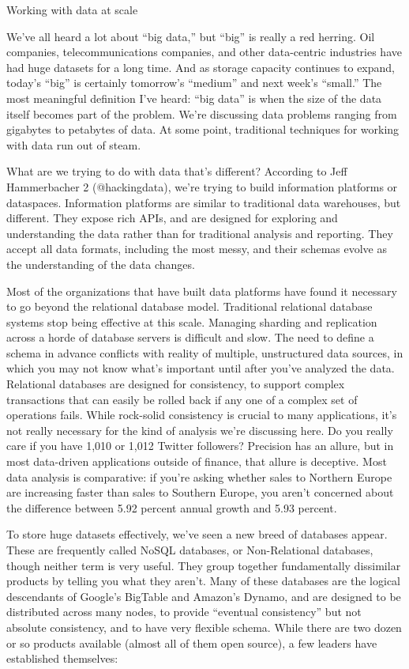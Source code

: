 Working with data at scale

We’ve all heard a lot about “big data,” but “big” is really a red herring. Oil companies, telecommunications companies, and other data-centric industries have had huge datasets for a long time. And as storage capacity continues to expand, today’s “big” is certainly tomorrow’s “medium” and next week’s “small.” The most meaningful definition I’ve heard: “big data” is when the size of the data itself becomes part of the problem. We’re discussing data problems ranging from gigabytes to petabytes of data. At some point, traditional techniques for working with data run out of steam.

What are we trying to do with data that’s different? According to Jeff Hammerbacher 2 (@hackingdata), we’re trying to build information platforms or dataspaces. Information platforms are similar to traditional data warehouses, but different. They expose rich APIs, and are designed for exploring and understanding the data rather than for traditional analysis and reporting. They accept all data formats, including the most messy, and their schemas evolve as the understanding of the data changes.

Most of the organizations that have built data platforms have found it necessary to go beyond the relational database model. Traditional relational database systems stop being effective at this scale. Managing sharding and replication across a horde of database servers is difficult and slow. The need to define a schema in advance conflicts with reality of multiple, unstructured data sources, in which you may not know what’s important until after you’ve analyzed the data. Relational databases are designed for consistency, to support complex transactions that can easily be rolled back if any one of a complex set of operations fails. While rock-solid consistency is crucial to many applications, it’s not really necessary for the kind of analysis we’re discussing here. Do you really care if you have 1,010 or 1,012 Twitter followers? Precision has an allure, but in most data-driven applications outside of finance, that allure is deceptive. Most data analysis is comparative: if you’re asking whether sales to Northern Europe are increasing faster than sales to Southern Europe, you aren’t concerned about the difference between 5.92 percent annual growth and 5.93 percent.

To store huge datasets effectively, we’ve seen a new breed of databases appear. These are frequently called NoSQL databases, or Non-Relational databases, though neither term is very useful. They group together fundamentally dissimilar products by telling you what they aren’t. Many of these databases are the logical descendants of Google’s BigTable and Amazon’s Dynamo, and are designed to be distributed across many nodes, to provide “eventual consistency” but not absolute consistency, and to have very flexible schema. While there are two dozen or so products available (almost all of them open source), a few leaders have established themselves:


